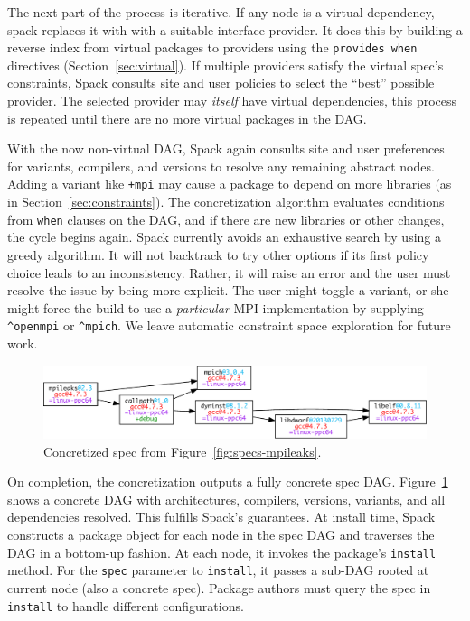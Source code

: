 The next part of the process is iterative.
If any node is a virtual dependency, spack replaces it with with a
suitable interface provider.  It does this by building a reverse
index from virtual packages to providers using the {\tt provides when}
directives (Section~\ref{sec:virtual}). If multiple providers
satisfy the virtual spec's constraints,
Spack consults site and user policies to select the ``best'' possible
provider.  The selected provider may {\it itself} have virtual dependencies,
this process is repeated until there are no more virtual packages in the DAG.

With the now non-virtual DAG, Spack again consults site and user preferences for
variants, compilers, and versions to resolve any remaining abstract nodes.
Adding a variant like {\tt +mpi} may cause a package to depend on more
libraries (as in Section~\ref{sec:constraints}). The concretization algorithm
evaluates conditions from {\tt when} clauses on the DAG, and if there are
new libraries or other changes, the cycle begins again.
Spack currently avoids an exhaustive search by using a greedy algorithm.
It will not backtrack to try other options if its first policy choice leads
to an inconsistency.  Rather, it will raise an error and the user must resolve
the issue by being more explicit.  The user might toggle a variant, or she might
force the build to use a {\it particular} MPI implementation
by supplying \verb|^openmpi| or \verb|^mpich|.  We leave automatic constraint
space exploration for future work.


\begin{figure}
	\centering
	\includegraphics[width=\columnwidth]{specs/mpileaks-concrete.pdf}
	\caption{
		Concretized spec from Figure~\ref{fig:specs-mpileaks}.
		\label{fig:specs-mpileaks-concrete}
	}
\end{figure}
On completion, the concretization outputs a fully concrete spec DAG.
Figure~\ref{fig:specs-mpileaks-concrete} shows a concrete DAG with architectures,
compilers, versions, variants, and all dependencies resolved.
This fulfills Spack's guarantees.
%
At install time, Spack constructs a package object for each node in the spec DAG
and traverses the DAG in a bottom-up fashion.  At each node, it invokes the package's
{\tt install} method.  For the {\tt spec} parameter to {\tt install}, it passes
a sub-DAG rooted at current node (also a concrete spec).  Package authors must
query the spec in {\tt install} to handle different configurations.


